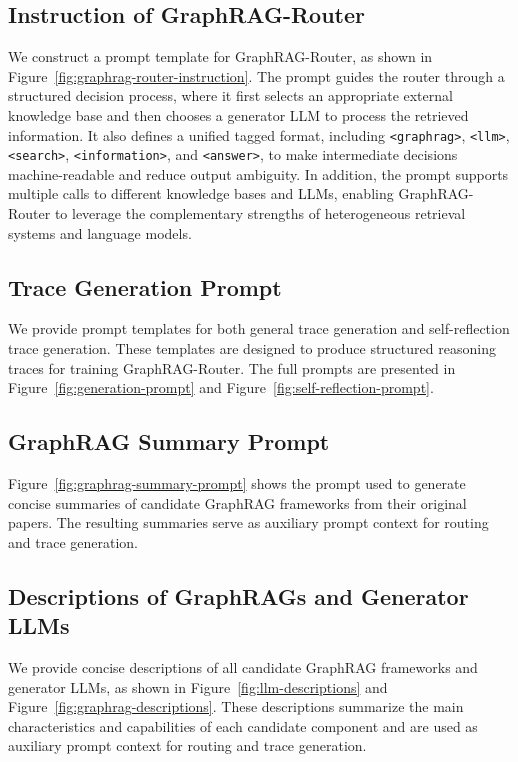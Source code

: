 \subsection{Instruction of GraphRAG-Router}
We construct a prompt template for GraphRAG-Router, as shown in Figure~\ref{fig:graphrag-router-instruction}. The prompt guides the router through a structured decision process, where it first selects an appropriate external knowledge base and then chooses a generator LLM to process the retrieved information. It also defines a unified tagged format, including \texttt{<graphrag>}, \texttt{<llm>}, \texttt{<search>}, \texttt{<information>}, and \texttt{<answer>}, to make intermediate decisions machine-readable and reduce output ambiguity. In addition, the prompt supports multiple calls to different knowledge bases and LLMs, enabling GraphRAG-Router to leverage the complementary strengths of heterogeneous retrieval systems and language models.

\subsection{Trace Generation Prompt}
\label{app:gen}
We provide prompt templates for both general trace generation and self-reflection trace generation. These templates are designed to produce structured reasoning traces for training GraphRAG-Router. The full prompts are presented in Figure~\ref{fig:generation-prompt} and Figure~\ref{fig:self-reflection-prompt}.


\subsection{GraphRAG Summary Prompt}
Figure~\ref{fig:graphrag-summary-prompt} shows the prompt used to generate concise summaries of candidate GraphRAG frameworks from their original papers. The resulting summaries serve as auxiliary prompt context for routing and trace generation.

\subsection{Descriptions of GraphRAGs and Generator LLMs}
We provide concise descriptions of all candidate GraphRAG frameworks and generator LLMs, as shown in Figure~\ref{fig:llm-descriptions} and Figure~\ref{fig:graphrag-descriptions}. These descriptions summarize the main characteristics and capabilities of each candidate component and are used as auxiliary prompt context for routing and trace generation.

